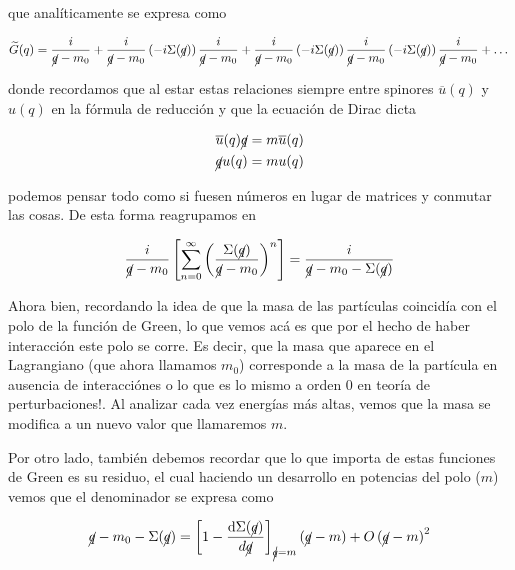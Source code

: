 \documentclass[tickz]{article}
\numberwithin{equation}{section}
\begin{document}
que analíticamente se expresa como 

\begin{equation}\label{key}
 \widetilde{G}(q) = \frac{i}{\cancel{q}- m_0} + \frac{i}{\cancel{q}- m_0} \left(-i \Sigma(\cancel{q})\right) \frac{i}{\cancel{q}- m_0} + \frac{i}{\cancel{q}- m_0} \left(-i \Sigma(\cancel{q})\right) \frac{i}{\cancel{q}- m_0}\left(-i \Sigma(\cancel{q})\right) \frac{i}{\cancel{q}- m_0} + \dots
\end{equation}

donde recordamos que al estar estas relaciones siempre entre spinores $ \overline{u}(q) $ y $ u(q) $ en la fórmula de reducción y que la ecuación de Dirac dicta

\begin{equation}\label{key}
\begin{aligned}
\overline{u}(q) \cancel{q}&=m\overline{u}(q)\\
\cancel{q} u(q)&= m u(q)
\end{aligned}
\end{equation}

podemos pensar todo como si fuesen números en lugar de matrices y conmutar las cosas. De esta forma reagrupamos en

\begin{equation}\label{mpolo}
\frac{i}{\cancel{q}- m_0} \left[ \sum_{n=0}^{\infty} \left(\frac{\Sigma(\cancel{q})}{\cancel{q}- m_0}\right)^n\right] = \frac{i}{\cancel{q}- m_0 - \Sigma(\cancel{q})}
\end{equation}

Ahora bien, recordando la idea de que la masa de las partículas coincidía con el polo de la función de Green, lo que vemos acá es que por el hecho de haber interacción este polo se corre. Es decir, que la masa que aparece en el Lagrangiano  (que ahora llamamos $ m_0 $) corresponde a la masa de la partícula en ausencia de interacciónes o lo que es lo mismo a orden 0 en teoría de perturbaciones!. Al analizar cada vez energías más altas, vemos que la masa se modifica a un nuevo valor que llamaremos $ m $. 

Por otro lado, también debemos recordar que lo que importa de estas funciones de Green es su residuo, el cual haciendo un desarrollo en potencias del polo ($ m $) vemos que el denominador se expresa como

\begin{equation}\label{key}
\cancel{q} - m_0 - \Sigma(\cancel{q}) = \left[ 1 -\frac{\mathrm{d}\Sigma(\cancel{q})}{d\cancel{q}}\right]_{\cancel{q}=m} \left(\cancel{q}-m\right)  + O\left(\cancel{q}-m\right)^2
\end{equation}
\end{document}
